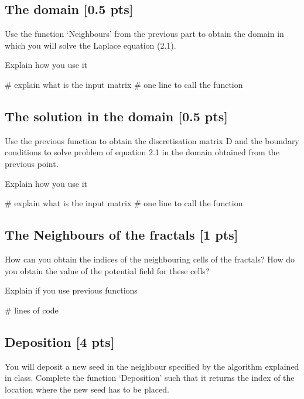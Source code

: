 \documentclass[paper=a4, fontsize=12pt]{scrartcl} %
\numberwithin{equation}{section}       %
\numberwithin{figure}{section}         %
\numberwithin{table}{section}          %
\begin{document}
\subsection{The domain [0.5 pts] }
Use the function `Neighbours' from the previous part to obtain the domain in which you will solve the Laplace equation (2.1).  

 \begin{tcolorbox}
  Explain how you use it 
\begin{python}
# explain what is the input matrix
# one line to call the function
\end{python}
 \end{tcolorbox}


\subsection{The solution in the domain [0.5 pts] }
Use the previous function to obtain the discretisation matrix D and the boundary conditions to solve problem of equation 2.1 in the domain obtained from the previous point. 

 \begin{tcolorbox}
  Explain how you use it 
\begin{python}
# explain what is the input matrix
# one line to call the function
\end{python}
 \end{tcolorbox}

\subsection{The Neighbours of the fractals [1 pts] }
How can you obtain the indices of the neighbouring cells of the fractals? How do you obtain the value of the potential field for these cells?


 \begin{tcolorbox}
 Explain if you use previous functions
\begin{python}
#  lines of code

\end{python}
 \end{tcolorbox}



\subsection{Deposition [4 pts]  }
You will deposit a new seed in the neighbour specified by the algorithm explained in class. Complete the function `Deposition' such that it returns the index of the location where the new seed has to be placed.  
\end{document}
